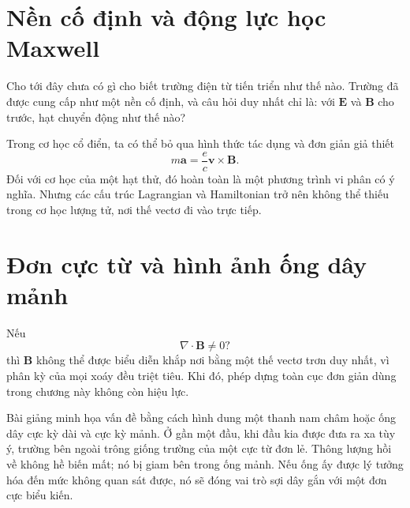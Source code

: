 \section{Nền cố định và động lực học Maxwell}

Cho tới đây chưa có gì cho biết trường điện từ tiến triển như thế nào. Trường đã được cung cấp như một nền cố định, và câu hỏi duy nhất chỉ là: với \(\mathbf E\) và \(\mathbf B\) cho trước, hạt chuyển động như thế nào?

\begin{classroomqa}
\end{classroomqa}

Trong cơ học cổ điển, ta có thể bỏ qua hình thức tác dụng và đơn giản giả thiết
\begin{equation}
  m\mathbf a=\frac{e}{c}\mathbf v\times\mathbf B.
\end{equation}
Đối với cơ học của một hạt thử, đó hoàn toàn là một phương trình vi phân có ý nghĩa. Nhưng các cấu trúc Lagrangian và Hamiltonian trở nên không thể thiếu trong cơ học lượng tử, nơi thế vectơ đi vào trực tiếp.

\section{Đơn cực từ và hình ảnh ống dây mảnh}

Nếu
\begin{equation}
  \nabla\cdot\mathbf B\neq0?
\end{equation}
thì \(\mathbf B\) không thể được biểu diễn khắp nơi bằng một thế vectơ trơn duy nhất, vì phân kỳ của mọi xoáy đều triệt tiêu. Khi đó, phép dựng toàn cục đơn giản dùng trong chương này không còn hiệu lực.

Bài giảng minh họa vấn đề bằng cách hình dung một thanh nam châm hoặc ống dây cực kỳ dài và cực kỳ mảnh. Ở gần một đầu, khi đầu kia được đưa ra xa tùy ý, trường bên ngoài trông giống trường của một cực từ đơn lẻ. Thông lượng hồi về không hề biến mất; nó bị giam bên trong ống mảnh. Nếu ống ấy được lý tưởng hóa đến mức không quan sát được, nó sẽ đóng vai trò sợi dây gắn với một đơn cực biểu kiến.

